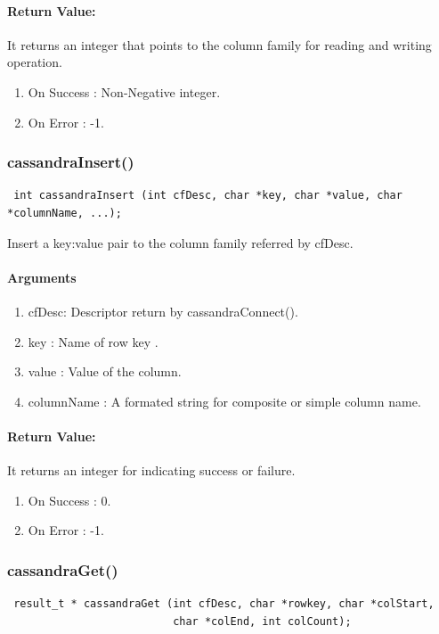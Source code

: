  \paragraph{Return Value:}
 It returns an integer that points to the column family for reading and writing operation.
\begin{enumerate}
 \item On Success : Non-Negative integer. 
 \item On Error   : -1.
\end{enumerate}

\subsubsection{cassandraInsert()}
\begin{verbatim}
 int cassandraInsert (int cfDesc, char *key, char *value, char *columnName, ...);
\end{verbatim}

  Insert  a key:value pair to the column family referred by cfDesc.

  \paragraph{Arguments}
  \begin{enumerate}
   \item cfDesc: Descriptor return by cassandraConnect().
   \item key : Name of row key .
   \item value :       Value of the column.
   \item columnName : A formated string for composite or simple column name.
  \end{enumerate}

 \paragraph{Return Value:}
 It returns an integer for indicating success or failure.
\begin{enumerate}
 \item On Success : 0.
 \item On Error   : -1.
\end{enumerate}

\subsubsection{cassandraGet()}
\begin{verbatim}
 result_t * cassandraGet (int cfDesc, char *rowkey, char *colStart, 
                          char *colEnd, int colCount);
\end{verbatim}

